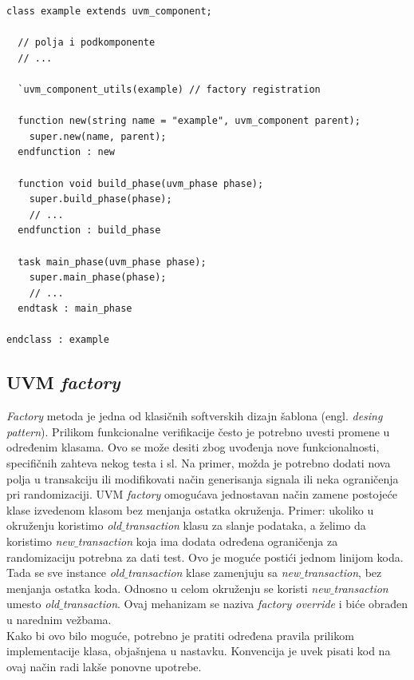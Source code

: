 \begin{lstlisting}
class example extends uvm_component;

  // polja i podkomponente
  // ...

  `uvm_component_utils(example) // factory registration

  function new(string name = "example", uvm_component parent);
    super.new(name, parent);
  endfunction : new

  function void build_phase(uvm_phase phase);
    super.build_phase(phase);
    // ...
  endfunction : build_phase

  task main_phase(uvm_phase phase);
    super.main_phase(phase);
    // ...
  endtask : main_phase

endclass : example
\end{lstlisting}


\subsection{UVM \emph{factory}}

\emph{Factory} metoda je jedna od klasičnih softverskih dizajn šablona (engl.
\emph{desing pattern}). Prilikom funkcionalne verifikacije često je potrebno
uvesti promene u određenim klasama. Ovo se može desiti zbog uvođenja nove
funkcionalnosti, specifičnih zahteva nekog testa i sl. Na primer, možda je
potrebno dodati nova polja u transakciju ili modifikovati način generisanja
signala ili neka ograničenja pri randomizaciji. UVM \emph{factory} omogućava
jednostavan način zamene postojeće klase izvedenom klasom bez menjanja ostatka
okruženja. Primer: ukoliko u okruženju koristimo \emph{old\(\_\)transaction}
klasu za slanje podataka, a želimo da koristimo \emph{new\(\_\)transaction} koja
ima dodata određena ograničenja za randomizaciju potrebna za dati test. Ovo je
moguće postići jednom linijom koda. Tada se sve instance
\emph{old\(\_\)transaction} klase zamenjuju sa \emph{new\(\_\)transaction}, bez
menjanja ostatka koda. Odnosno u celom okruženju se koristi
\emph{new\(\_\)transaction} umesto \emph{old\(\_\)transaction}. Ovaj mehanizam
se naziva \emph{factory override} i biće obrađen u narednim vežbama.\\

Kako bi ovo bilo moguće, potrebno je pratiti određena pravila prilikom
implementacije klasa, objašnjena u nastavku. Konvencija je uvek pisati kod na
ovaj način radi lakše ponovne upotrebe.

